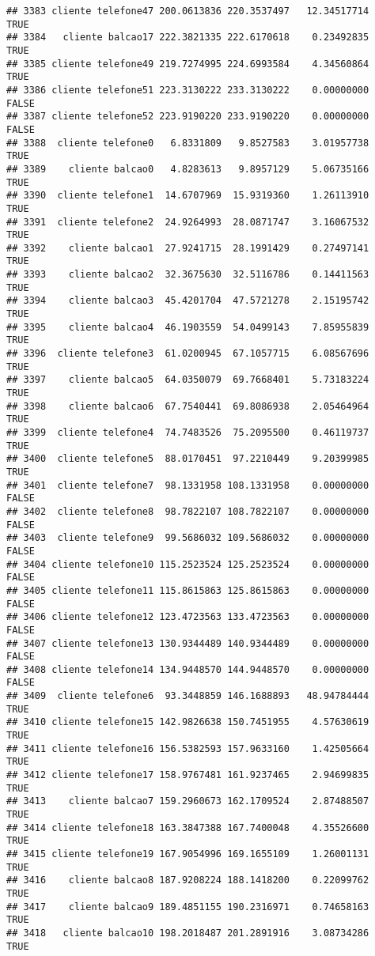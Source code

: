 \documentclass[
]{article}
\begin{document}
\begin{verbatim}
## 3383 cliente telefone47 200.0613836 220.3537497   12.34517714     TRUE
## 3384   cliente balcao17 222.3821335 222.6170618    0.23492835     TRUE
## 3385 cliente telefone49 219.7274995 224.6993584    4.34560864     TRUE
## 3386 cliente telefone51 223.3130222 233.3130222    0.00000000    FALSE
## 3387 cliente telefone52 223.9190220 233.9190220    0.00000000    FALSE
## 3388  cliente telefone0   6.8331809   9.8527583    3.01957738     TRUE
## 3389    cliente balcao0   4.8283613   9.8957129    5.06735166     TRUE
## 3390  cliente telefone1  14.6707969  15.9319360    1.26113910     TRUE
## 3391  cliente telefone2  24.9264993  28.0871747    3.16067532     TRUE
## 3392    cliente balcao1  27.9241715  28.1991429    0.27497141     TRUE
## 3393    cliente balcao2  32.3675630  32.5116786    0.14411563     TRUE
## 3394    cliente balcao3  45.4201704  47.5721278    2.15195742     TRUE
## 3395    cliente balcao4  46.1903559  54.0499143    7.85955839     TRUE
## 3396  cliente telefone3  61.0200945  67.1057715    6.08567696     TRUE
## 3397    cliente balcao5  64.0350079  69.7668401    5.73183224     TRUE
## 3398    cliente balcao6  67.7540441  69.8086938    2.05464964     TRUE
## 3399  cliente telefone4  74.7483526  75.2095500    0.46119737     TRUE
## 3400  cliente telefone5  88.0170451  97.2210449    9.20399985     TRUE
## 3401  cliente telefone7  98.1331958 108.1331958    0.00000000    FALSE
## 3402  cliente telefone8  98.7822107 108.7822107    0.00000000    FALSE
## 3403  cliente telefone9  99.5686032 109.5686032    0.00000000    FALSE
## 3404 cliente telefone10 115.2523524 125.2523524    0.00000000    FALSE
## 3405 cliente telefone11 115.8615863 125.8615863    0.00000000    FALSE
## 3406 cliente telefone12 123.4723563 133.4723563    0.00000000    FALSE
## 3407 cliente telefone13 130.9344489 140.9344489    0.00000000    FALSE
## 3408 cliente telefone14 134.9448570 144.9448570    0.00000000    FALSE
## 3409  cliente telefone6  93.3448859 146.1688893   48.94784444     TRUE
## 3410 cliente telefone15 142.9826638 150.7451955    4.57630619     TRUE
## 3411 cliente telefone16 156.5382593 157.9633160    1.42505664     TRUE
## 3412 cliente telefone17 158.9767481 161.9237465    2.94699835     TRUE
## 3413    cliente balcao7 159.2960673 162.1709524    2.87488507     TRUE
## 3414 cliente telefone18 163.3847388 167.7400048    4.35526600     TRUE
## 3415 cliente telefone19 167.9054996 169.1655109    1.26001131     TRUE
## 3416    cliente balcao8 187.9208224 188.1418200    0.22099762     TRUE
## 3417    cliente balcao9 189.4851155 190.2316971    0.74658163     TRUE
## 3418   cliente balcao10 198.2018487 201.2891916    3.08734286     TRUE

\end{verbatim}
\end{document}
